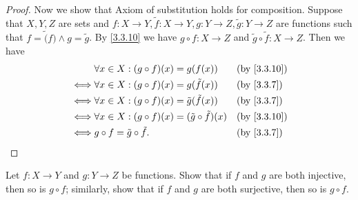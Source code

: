\begin{proof}
  Now we show that Axiom of substitution holds for composition.
  Suppose that \(X, Y, Z\) are sets and \(f : X \to Y, \tilde{f} : X \to Y, g : Y \to Z, \tilde{g} : Y \to Z\) are functions such that \(f = \tilde(f) \land g = \tilde{g}\).
  By \cref{3.3.10} we have \(g \circ f : X \to Z\) and \(\tilde{g} \circ \tilde{f} : X \to Z\).
  Then we have
  \begin{align*}
         & \forall x \in X : (g \circ f)(x) = g(f(x))                        &  & \text{(by \cref{3.3.10})} \\
    \iff & \forall x \in X : (g \circ f)(x) = g(\tilde{f}(x))                &  & \by{3.3.7}                \\
    \iff & \forall x \in X : (g \circ f)(x) = \tilde{g}(\tilde{f}(x))        &  & \by{3.3.7}                \\
    \iff & \forall x \in X : (g \circ f)(x) = (\tilde{g} \circ \tilde{f})(x) &  & \text{(by \cref{3.3.10})} \\
    \iff & g \circ f = \tilde{g} \circ \tilde{f}.                            &  & \by{3.3.7}
  \end{align*}
\end{proof}

\begin{ex}\label{ex:3.3.2}
  Let \(f : X \to Y\) and \(g : Y \to Z\) be functions.
  Show that if \(f\) and \(g\) are both injective, then so is \(g \circ f\);
  similarly, show that if \(f\) and \(g\) are both surjective, then so is \(g \circ f\).
\end{ex}

